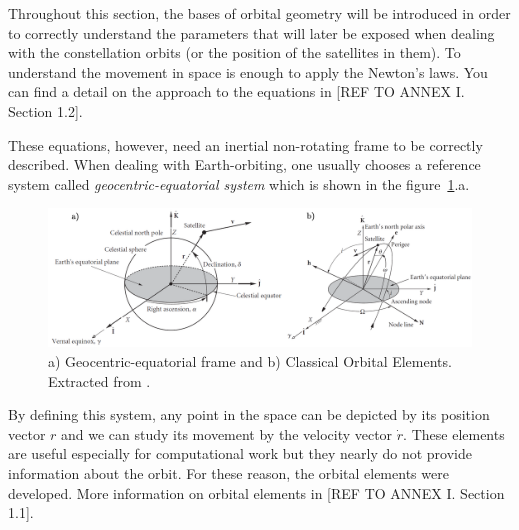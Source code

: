 Throughout this section, the bases of orbital geometry will be introduced in order to correctly understand the parameters that will later be exposed when dealing with the constellation orbits (or the position of the satellites in them). To understand the movement in space is enough to apply the Newton's laws. You can find a detail on the approach to the equations in [{REF TO ANNEX I. Section 1.2}].

These equations, however, need an inertial non-rotating frame to be correctly described. When dealing with Earth-orbiting, one usually chooses a reference system called \textit{geocentric-equatorial system} which is shown in the figure~\ref{fig:eqframe}.a. 

\begin{figure}[H]
\centering
\includegraphics[scale=.28]{./Geometry/fig-Ch1-Geometry/COE&eqframe.png}
\caption{a) Geocentric-equatorial frame and b) Classical Orbital Elements. Extracted from \cite{Howard}.}
\label{fig:eqframe}
\end{figure}

By defining this system, any point in the space can be depicted by its position vector $r$ and we can study its movement by the velocity vector $\dot{r}$. These elements are useful especially for computational work but they nearly do not provide information about the orbit. For these reason, the orbital elements were developed. More information on orbital elements in [{REF TO ANNEX I. Section 1.1}].



